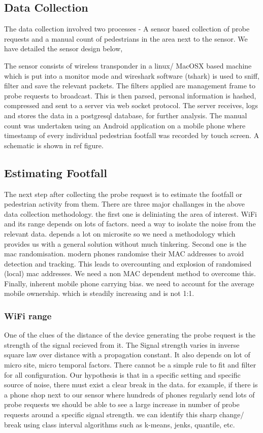 \subsection{Data Collection}
The data collection involved two processes - 
A sensor based collection of probe requests and
a manual count of pedestrians in the area next to the sensor.
We have detailed the sensor design below,

The sensor consists of wireless transponder in a linux/ MacOSX based machine
which is put into a monitor mode and
wireshark software (tshark) is used to sniff, filter and
save the relevant packets.
The filters applied are management frame to probe requests to broadcast. 
This is then parsed, personal information is hashed, 
compressed and sent to a server via web socket protocol.
The server receives, logs and stores the data in a postgresql database,
for further analysis.
The manual count was undertaken using an Android application
on a mobile phone where timestamp of every individual pedestrian footfall
was recorded by touch screen. A schematic is shown in ref figure.

\subsection{Estimating Footfall}
The next step after collecting the probe request is to estimate the footfall or pedestrian activity from them. There are three major challanges in the above data collection methodology.
the first one is deliniating the area of interest.
WiFi and its range depends on lots of factors.
need a way to isolate the noise from the relevant data. depends a lot on microsite so we need a methodology which provides us with a general solution without much tinkering.
Second one is the mac randomisation.
modern phones randomise their MAC addresses to avoid detection and tracking.
This leads to overcounting and explosion of randomised (local) mac addresses.
We need a non MAC dependent method to overcome this.
Finally, inherent mobile phone carrying bias. we need to account for the average mobile ownership. which is steadily increasing and is not 1:1.

\subsubsection{WiFi range}
One of the clues of the distance of the device generating the probe request is
the strength of the signal recieved from it.
The Signal strength varies in inverse square law over distance with a 
propagation constant.
It also depends on lot of micro site, micro temporal factors.
There cannot be a simple rule to fit and filter for all configuration.
Our hypothesis is that in a specific setting and specific source of noise,
there must exist a clear break in the data.
for example, if there is a phone shop next to our sensor where
hundreds of phones regularly send lots of probe requests
we should be able to see a large increase in number of probe requests around
a specific signal strength.
we can identify this sharp change/ break using class interval algorithms such as
k-means, jenks, quantile, etc.

